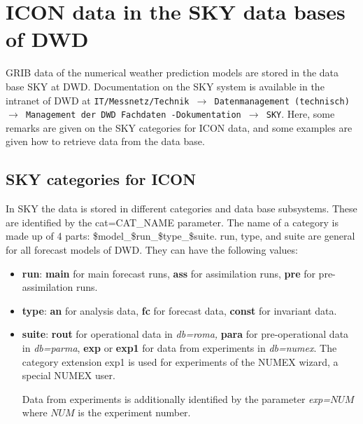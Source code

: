 \chapter{ICON data in the SKY data bases of DWD}


GRIB data of the numerical weather prediction models are stored in the data base
SKY at DWD.
Documentation on the SKY system is available in the intranet of DWD at
{\tt IT/Messnetz/Technik $\rightarrow$ Datenmanagement (technisch) $\rightarrow$
Management der DWD Fachdaten -Dokumentation $\rightarrow$ SKY}.
Here, some remarks are given on the SKY categories for ICON data, and some
examples are given how to retrieve data from the data base.

\section{SKY categories for ICON}

In SKY the data is stored in different categories and data base subsystems.
These are identified by the cat=CAT\_NAME parameter.
The name of a category is made up
of 4 parts: \${model}\_\${run}\_\${type}\_\${suite}. run, type, and suite are general
for all forecast models of DWD. They can have the following values:


\begin{itemize}
 \item \textbf{run}: \textbf{main} for main forecast runs,
                     \textbf{ass} for assimilation runs,
                     \textbf{pre} for pre-assimilation runs.
 \item \textbf{type}: \textbf{an} for analysis data,
                      \textbf{fc} for forecast data,
                      \textbf{const} for invariant data.
 \item \textbf{suite}: \textbf{rout} for operational data in \emph{db=roma,}
                       \textbf{para} for pre-operational data in \emph{db=parma},
                       \textbf{exp} or \textbf{exp1} for data from experiments in
                       \emph{db=numex}. The category extension exp1 is used for
                       experiments of the NUMEX wizard, a special NUMEX user.

                       Data from experiments is additionally
                       identified by the parameter \emph{exp=}$NUM$ where $NUM$ is
                       the experiment number.
\end{itemize}

